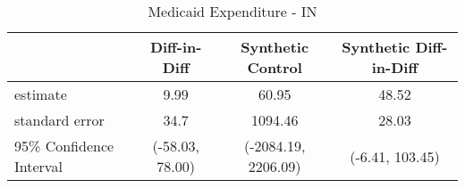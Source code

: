 \begin{table}[ht]
\centering
\begin{tabular}{lccc}
  \hline
 & Diff-in-Diff & Synthetic Control & Synthetic Diff-in-Diff \\ 
  \hline
estimate & 9.99 & 60.95 & 48.52 \\ 
  standard error & 34.7 & 1094.46 & 28.03 \\ 
  95\% Confidence Interval & (-58.03, 78.00) & (-2084.19, 2206.09) & (-6.41, 103.45) \\ 
   \hline
\end{tabular}
\caption{Medicaid Expenditure - IN} 
\end{table}

